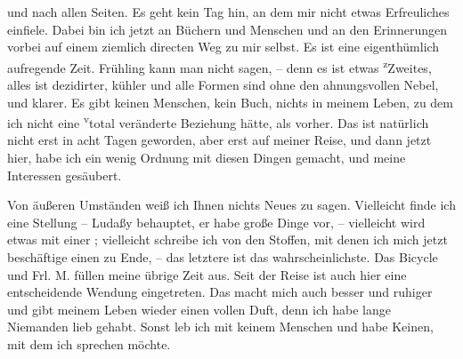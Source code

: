                  {\pb}und nach allen Seiten. Es
               geht kein Tag hin, an dem mir nicht etwas Erfreuliches einfiele. Dabei bin ich jetzt
               an Büchern und Menschen und an den Erinnerungen vorbei auf einem ziemlich directen
               Weg zu mir selbst. Es ist eine eigenthümlich aufregende Zeit. Frühling kann man nicht
               sagen, – denn es ist etwas \substVorne{}\textsuperscript{z}\substDazwischen{}Z\substHinten{}weites, alles ist dezidirter, kühler und alle Formen sind ohne den
               ahnungsvollen Nebel, und klarer. Es gibt keinen Menschen, kein Buch, nichts in meinem
               Leben, zu dem ich nicht eine \substVorne{}\textsuperscript{v}\substDazwischen{}t\substHinten{}otal veränderte Beziehung hätte, als vorher. Das ist natürlich nicht erst in
               acht Tagen geworden, aber erst auf meiner Reise, und dann jetzt hier, habe ich ein
               wenig Ordnung mit diesen Dingen gemacht, und meine Interessen gesäubert.\pend
           
\pstart
           Von äußeren Umständen weiß ich Ihnen {\pb}nichts Neues zu sagen.
               Vielleicht finde ich eine Stellung – Ludaßy
               behauptet, \strikeout{\textcolor{gray}{d}} er habe große Dinge vor, – vielleicht wird etwas mit einer \label{K_L03264-1v}\label{K_L03264-1}; vielleicht schreibe ich von den Stoffen, mit denen ich mich jetzt
               beschäftige einen zu Ende, – das letztere ist das wahrscheinlichste. \strikeout{\textcolor{gray}{×}\-\textcolor{gray}{×}\-\textcolor{gray}{×}} Das Bicycle und Frl. M. füllen meine
               übrige Zeit aus. Seit der Reise ist auch hier eine entscheidende Wendung eingetreten.
               Das macht mich auch besser und ruhiger und gibt meinem Leben wieder einen vollen
               Duft, denn ich habe lange Niemanden lieb gehabt. Sonst leb ich mit keinem Menschen
               und habe Keinen, mit dem ich sprechen möchte.\pend
           
